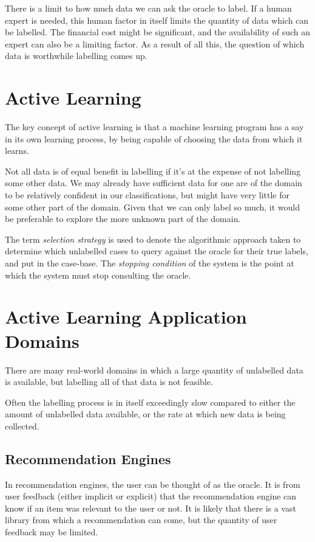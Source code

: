 \documentclass[a4paper,11pt]{report}
\begin{document}
There is a limit to how much data we can ask the oracle to label. If a human expert is needed, this human factor in itself limits the quantity of data which can be labelled. The financial cost might be significant, and the availability of such an expert can also be a limiting factor. As a result of all this, the question of which data is worthwhile labelling comes up.

\section{Active Learning}
The key concept of active learning is that a machine learning program has a say in its own learning process, by being capable of choosing the data from which it learns. 

Not all data is of equal benefit in labelling if it's at the expense of not labelling some other data. We may already have sufficient data for one are of the domain to be relatively confident in our classifications, but might have very little for some other part of the domain. Given that we can only label so much, it would be preferable to explore the more unknown part of the domain.

The term \emph{selection strategy} is used to denote the algorithmic approach taken to determine which unlabelled cases to query against the oracle for their true labels, and put in the case-base. The \emph{stopping condition} of the system is the point at which the system must stop consulting the oracle.

\section{Active Learning Application Domains}

There are many real-world domains in which a large quantity of unlabelled data is available, but labelling all of that data is not feasible. 

Often the labelling process is in itself exceedingly slow compared to either the amount of unlabelled data available, or the rate at which new data is being collected. 

\subsection{Recommendation Engines}
In recommendation engines, the user can be thought of as the oracle. It is from user feedback (either implicit or explicit) that the recommendation engine can know if an item was relevant to the user or not. It is likely that there is a vast library from which a recommendation can come, but the quantity of user feedback may be limited.
\end{document}
